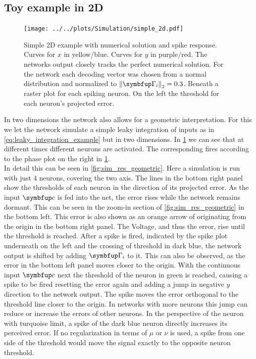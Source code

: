 \subsection{Toy example in 2D}

\begin{figure}[h!]
	\centering
	\texttt{[image: ../../plots/Simulation/simple\_2d.pdf]}
	\caption{Simple 2D example with numerical solution and spike response. Curves for $x$ in yellow/blue. Curves for $y$ in purple/red. The networks output closely tracks the perfect numerical solution. For the network each decoding vector was chosen from a normal distribution and normalized to $\left\lVert\bmu{\Gamma}_i\right\rVert_2 =0.3$. Beneath a raster plot for each spiking neuron. On the left the threshold for each neuron's projected error.}
	\label{fig:sim_res_simple}
\end{figure}

In two dimensions the network also allows for a geometric interpretation. For this we let the network simulate a simple leaky integration of inputs as in \cref{eq:leaky_integration_example} but in two dimensions. In \cref{fig:sim_res_simple} we can see that at different times different neurons are activated. The corresponding fires according to the phase plot on the right in \cref{fig:sim_res_simple}.\\
In detail this can be seen in \cref{fig:sim_res_geometric}. Here a simulation is run with just 4 neurons, covering the two axis. The lines in the bottom right panel show the thresholds of each neuron in the direction of its projected error. As the input $\bmu{c}$ is fed into the net, the error rises while the network remains dormant. This can be seen in the zoom-in section of \cref{fig:sim_res_geometric} in the bottom left. This error is also shown as an orange arrow of originating from the origin in the bottom right panel. The Voltage, and thus the error, rise until the threshold is reached. After a spike is fired, indicated by the spike plot underneath on the left and the crossing of threshold in dark blue, the network output is shifted by adding $\bmu{\Gamma}_i$ to it. This can also be observed, as the error in the bottom left panel moves closer to the origin. With the continuous input $\bmu{c}$ next the threshold of the neuron in green is reached, causing a spike to be fired resetting the error again and adding a jump in negative $y$ direction to the network output. The spike moves the error orthogonal to the threshold line closer to the origin. In networks with more neurons this jump can reduce or increase the errors of other neurons. In the perspective of the neuron with turquoise limit, a spike of the dark blue neuron directly increases its perceived error. If no regularization in terms of $\mu$ or $\nu$ is used, a spike from one side of the threshold would move the signal exactly to the opposite neuron threshold.

